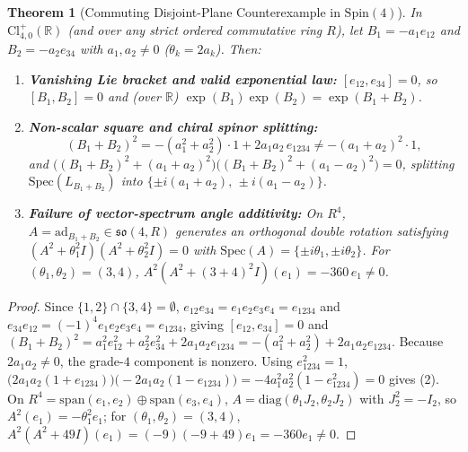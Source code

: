\documentclass[11pt]{article}
\newtheorem{theorem}{Theorem}[section]
\theoremstyle{definition}
\newcommand{\Cl}{\mathrm{Cl}}
\newcommand{\Spin}{\mathrm{Spin}}
\newcommand{\solie}{\mathfrak{so}}
\newcommand{\Spec}{\mathrm{Spec}}
\newcommand{\ad}{\mathrm{ad}}
\begin{document}
\begin{theorem}[Commuting Disjoint-Plane Counterexample in $\Spin(4)$]\label{thm:spin4}
In $\Cl_{4,0}^+(\mathbb{R})$ (and over any strict ordered commutative ring $R$), let
$B_1 = -a_1 e_{12}$ and $B_2 = -a_2 e_{34}$ with $a_1, a_2 \neq 0$ ($\theta_k = 2a_k$). Then:
\begin{enumerate}
  \item \textbf{Vanishing Lie bracket and valid exponential law:} $[e_{12}, e_{34}] = 0$, so
    $[B_1, B_2] = 0$ and (over $\mathbb{R}$) $\exp(B_1)\exp(B_2) = \exp(B_1 + B_2)$.
  \item \textbf{Non-scalar square and chiral spinor splitting:}
    \begin{equation}
      (B_1 + B_2)^2 = -(a_1^2 + a_2^2)\cdot 1 + 2 a_1 a_2\, e_{1234}
      \neq -(a_1 + a_2)^2 \cdot 1,
    \end{equation}
    and $\bigl((B_1 + B_2)^2 + (a_1 + a_2)^2\bigr)\bigl((B_1 + B_2)^2 + (a_1 - a_2)^2\bigr) = 0$,
    splitting $\Spec(L_{B_1 + B_2})$ into $\{\pm i(a_1 + a_2),\, \pm i(a_1 - a_2)\}$.
  \item \textbf{Failure of vector-spectrum angle additivity:} On $R^4$, $A = \ad_{B_1 + B_2} \in
    \solie(4, R)$ generates an orthogonal double rotation satisfying
    $(A^2 + \theta_1^2 I)(A^2 + \theta_2^2 I) = 0$ with $\Spec(A) = \{\pm i\theta_1, \pm i\theta_2\}$.
    For $(\theta_1, \theta_2) = (3, 4)$, $A^2(A^2 + (3 + 4)^2 I)(e_1) = -360\, e_1 \neq 0$.
\end{enumerate}
\end{theorem}

\begin{proof}
Since $\{1, 2\} \cap \{3, 4\} = \emptyset$, $e_{12} e_{34} = e_1 e_2 e_3 e_4 = e_{1234}$ and
$e_{34} e_{12} = (-1)^4 e_1 e_2 e_3 e_4 = e_{1234}$, giving $[e_{12}, e_{34}] = 0$ and
$(B_1 + B_2)^2 = a_1^2 e_{12}^2 + a_2^2 e_{34}^2 + 2a_1 a_2 e_{1234} = -(a_1^2 + a_2^2) +
2a_1 a_2 e_{1234}$. Because $2 a_1 a_2 \neq 0$, the grade-$4$ component is nonzero. Using
$e_{1234}^2 = 1$, $\bigl(2a_1 a_2(1 + e_{1234})\bigr)\bigl(-2a_1 a_2(1 - e_{1234})\bigr)
= -4a_1^2 a_2^2(1 - e_{1234}^2) = 0$ gives (2). On $R^4 = \mathrm{span}(e_1, e_2) \oplus
\mathrm{span}(e_3, e_4)$, $A = \mathrm{diag}(\theta_1 J_2, \theta_2 J_2)$ with $J_2^2 = -I_2$,
so $A^2(e_1) = -\theta_1^2 e_1$; for $(\theta_1, \theta_2) = (3, 4)$,
$A^2(A^2 + 49 I)(e_1) = (-9)(-9 + 49)e_1 = -360 e_1 \neq 0$.
\end{proof}
\end{document}
